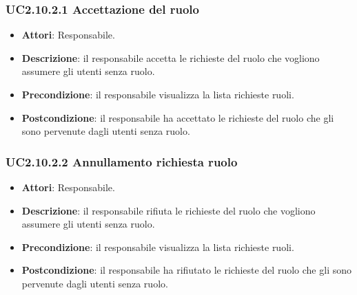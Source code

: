 \subsubsection{UC2.10.2.1 Accettazione del ruolo}
\begin{itemize}
\item \textbf{Attori}: Responsabile.
\item \textbf{Descrizione}: il responsabile accetta  le richieste  del ruolo che vogliono assumere gli utenti senza ruolo.
\item \textbf{Precondizione}: il responsabile visualizza la lista richieste ruoli.
\item \textbf{Postcondizione}: il responsabile ha accettato le richieste del ruolo che gli sono pervenute dagli utenti senza ruolo.
\end{itemize}
\subsubsection{UC2.10.2.2 Annullamento richiesta ruolo}
\begin{itemize}
\item \textbf{Attori}: Responsabile.
\item \textbf{Descrizione}: il responsabile rifiuta le richieste  del ruolo che vogliono assumere gli utenti senza ruolo.
\item \textbf{Precondizione}: il responsabile visualizza la lista richieste ruoli.
\item \textbf{Postcondizione}: il responsabile ha rifiutato le richieste del ruolo che gli sono pervenute dagli utenti senza ruolo.
\end{itemize}